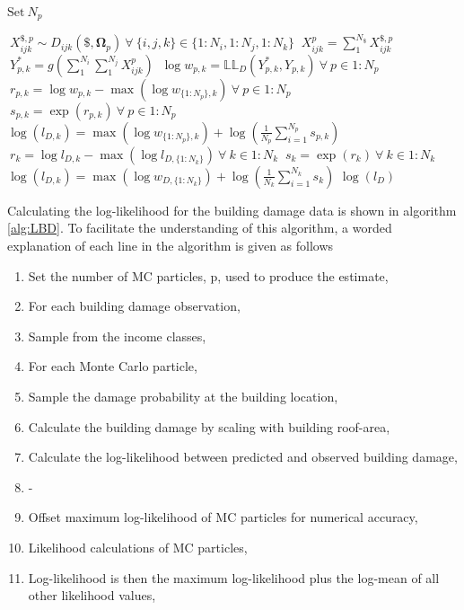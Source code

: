 \documentclass[10pt,a4paper]{article}
\begin{document}
\begin{multicols}{1}
\begin{algorithm}[H]
\begin{algorithmic}[1]
\begin{spacing}{1.5}
\STATE $\text{Set} \ N_p $

              \STATE $\ X_{ijk}^{\$,p} \sim D_{ijk}(\$,\boldsymbol{\Omega}_p) \ \forall \ \{i,j,k\} \in \{1:N_{i},1:N_{j},1:N_{k}\} $
       \ENDFOR
\ENDFOR
\STATE $ \ X_{ijk}^p = \sum_1^{N_{\$}} X_{ijk}^{\$,p}$
\STATE $ \ Y^*_{p,k} = g\left(\sum_1^{N_{i}}\sum_1^{N_{j}}X_{ijk}^p\right)$
\STATE $ \ \log{w_{p,k}} = \mathbb{LL}_D(Y^*_{p,k},Y_{p,k})\  \forall \ p \in 1:N_p$
\STATE $ \ r_{p,k} = \log{w_{p,k}} - \max{(\log{w_{\{1:N_p\},k}})} \  \forall \ p \in 1:N_p $
\STATE $ \ s_{p,k} = \exp{(r_{p,k})} \  \forall \ p \in 1:N_p $
\STATE $\log(l_{D,k}) = \max{(\log{w_{\{1:N_p\},k}})} + \log{(\frac{1}{N_p}\sum_{i=1}^{N_p} s_{p,k})}$
\ENDFOR
\STATE $ \ r_{k} = \log{l_{D,k}} - \max{(\log{l_{D,\{1:N_k\}}})} \  \forall \ k \in 1:N_k $
\STATE $ \ s_{k} = \exp{(r_{k})} \  \forall \ k \in 1:N_k $
\STATE $\log(l_{D,k}) = \max{(\log{w_{D,\{1:N_k\}}})} + \log{(\frac{1}{N_k}\sum_{i=1}^{N_k} s_{k})}$
\RETURN $\log(l_D)$
\end{spacing}
\end{algorithmic}
\end{algorithm}
Calculating the log-likelihood for the building damage data is shown in algorithm \ref{alg:LBD}. To facilitate the understanding of this algorithm, a worded explanation of each line in the algorithm is given as follows
\begin{enumerate}
\item Set the number of MC particles, p, used to produce the estimate,
\item For each building damage observation,
\item Sample from the income classes,
\item For each Monte Carlo particle,
\item Sample the damage probability at the building location,
\item Calculate the building damage by scaling with building roof-area,
\item Calculate the log-likelihood between predicted and observed building damage,
\item -
\item Offset maximum log-likelihood of MC particles for numerical accuracy,
\item Likelihood calculations of MC particles,
\item Log-likelihood is then the maximum log-likelihood plus the log-mean of all other likelihood values,

\end{enumerate}
\end{multicols}
\end{document}
